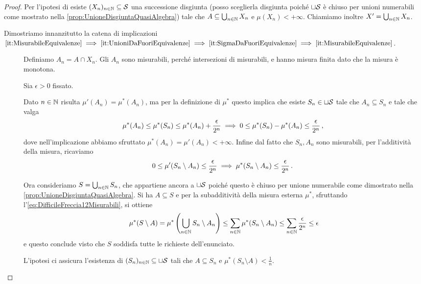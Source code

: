 \begin{proof}
	Per l'ipotesi di \sigfin[ezza] esiste $(X_n)_{n\in\N}\subseteq \S$ una successione disgiunta (posso sceglierla disgiunta poiché $\sqcup\S$ è chiuso per unioni numerabili come mostrato nella \cref{prop:UnioneDisgiuntaQuasiAlgebra}) tale che $A\subseteq \bigcup_{n\in\N}X_n$ e $\mu(X_n)<+\infty$. Chiamiamo inoltre $X'=\bigcup_{n\in\N}X_n$.
	
	Dimostriamo innanzitutto la catena di implicazioni
	$\text{\ref{it:MisurabileEquivalenze}}\implies
	\text{\ref{it:UnioniDaFuoriEquivalenze}}\implies
	\text{\ref{it:SigmaDaFuoriEquivalenze}}\implies
	\text{\ref{it:MisurabileEquivalenze}}$.
	\begin{description}
		\item[] Definiamo $A_n=A\cap X_n$. Gli $A_n$ sono misurabili, perché intersezioni di misurabili, e hanno misura finita dato che la misura è monotona.
		
		Sia $\epsilon>0$ fissato.
		
		Dato $n\in\N$ risulta $\mu'(A_n)=\mu^*(A_n)$, ma per la definizione di $\mu^*$ questo implica che esiste $S_n\in\sqcup \S$ tale che $A_n\subseteq S_n$ e tale che valga
		\begin{equation*}
			\mu^*(A_n)\le \mu^*(S_n) \le \mu^*(A_n)+\frac\epsilon{2^n}\implies
			0\le \mu^*(S_n)-\mu^*(A_n)\le \frac\epsilon{2^n} \virgola
		\end{equation*}
		dove nell'implicazione abbiamo sfruttato $\mu^*(A_n)=\mu'(A_n)<+\infty$.
		Infine dal fatto che $S_n,A_n$ sono misurabili, per l'additività della misura, ricaviamo
		\begin{equation}\label{eq:DifficileFreccia12Misurabili}
			0\le \mu'(S_n\setminus A_n) \le \frac\epsilon{2^n} \implies \mu^*(S_n\setminus A_n)\le \frac\epsilon{2^n}\punto
		\end{equation}
		
		Ora consideriamo $S=\bigcup_{n\in\N}S_n$, che appartiene ancora a $\sqcup\S$ poiché questo è chiuso per unione numerabile come dimostrato nella \cref{prop:UnioneDisgiuntaQuasiAlgebra}. Si ha $A\subseteq S$ e per la subadditività della misura esterna  $\mu^*$, sfruttando l'\cref{eq:DifficileFreccia12Misurabili}, si ottiene
		\begin{equation*}
			\mu^*(S\setminus A)=\mu^*\left(\bigcup_{n\in\N}S_n\setminus A_n\right)\le
			\sum_{n\in\N}\mu^*(S_n\setminus A_n)\le\sum_{n\in\N}\frac\epsilon{2^n}\le \epsilon
		\end{equation*}
		e questo conclude visto che $S$ soddisfa tutte le richieste dell'enunciato.
		\item[] L'ipotesi ci assicura l'esistenza di $(S_n)_{n\in\N}\subseteq \sqcup \S$ tali che $A\subseteq S_n$ e $\mu^*(S_n\setminus A)<\frac1n$.
		

\end{description}
\end{proof}
